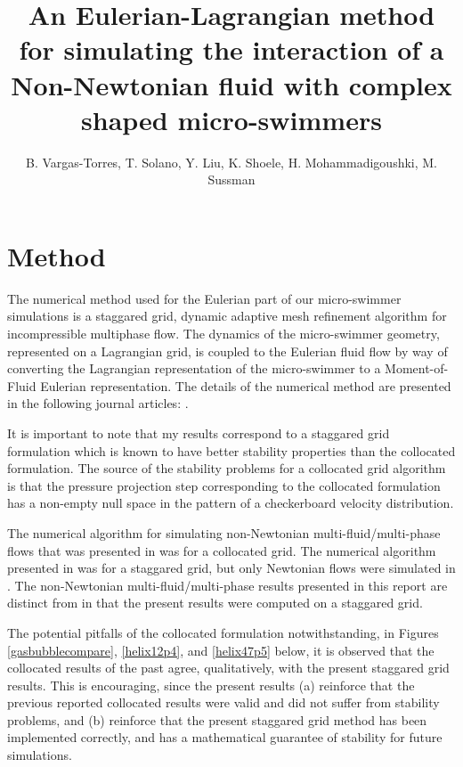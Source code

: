 \documentclass[]{article}
\title{An Eulerian-Lagrangian method for simulating the interaction of a 
 Non-Newtonian fluid with complex shaped micro-swimmers}
\author{B. Vargas-Torres,
   T. Solano, Y. Liu, K. Shoele, H. Mohammadigoushki, M. Sussman}
\begin{document}
\maketitle
\vspace*{-10mm}
\section{Method} 
The numerical method used for the Eulerian part of
our micro-swimmer simulations is a staggared
grid, dynamic adaptive mesh refinement algorithm for 
incompressible multiphase flow.  
The dynamics of the micro-swimmer geometry, represented on a 
Lagrangian grid, is coupled to the Eulerian fluid flow by way of converting
the Lagrangian representation of the micro-swimmer to a
Moment-of-Fluid Eulerian representation.  The details of the numerical method
are presented in the following journal articles: 
\cite{dyadechko2005moment,ArientiSussman2014,peihierarchical,OHTA201966}.

It is important to note that my results correspond to a staggared grid 
formulation which is known to have better stability properties than the
collocated formulation\cite{rhie1983numerical}.  
The source of the stability problems for a collocated grid algorithm
is that the pressure projection step corresponding
to the collocated formulation has a non-empty null space in the pattern of
a checkerboard velocity distribution.

The numerical algorithm
for simulating non-Newtonian multi-fluid/multi-phase flows that was
presented in \cite{OHTA201966} was for a collocated grid.  The numerical
algorithm presented in \cite{peihierarchical} was for a staggared grid,
but only Newtonian flows were simulated in \cite{peihierarchical}.
The non-Newtonian multi-fluid/multi-phase results presented in 
this report are distinct from \cite{OHTA201966}
in that the present results were computed on a staggared grid.

The potential pitfalls of the collocated formulation notwithstanding,
in Figures \ref{gasbubblecompare}, \ref{helix12p4}, and
\ref{helix47p5} below, it is observed that the collocated results of the
past agree, qualitatively, with the present staggared grid results.  This
is encouraging, since the present results (a) reinforce that the previous 
reported collocated results were valid and did not suffer from stability 
problems, and (b) reinforce that the present staggared grid method has 
been implemented correctly, and has a mathematical guarantee of 
stability\cite{GUITTET2015215} for future simulations.
\end{document}
